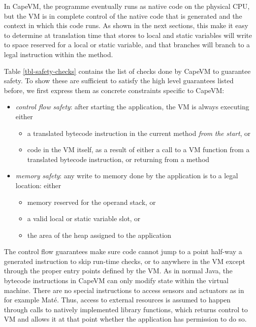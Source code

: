 In CapeVM, the programme eventually runs as native code on the physical CPU, but the VM is in complete control of the native code that is generated and the context in which this code runs. As shown in the next sections, this make it easy to determine at translation time that stores to local and static variables will write to space reserved for a local or static variable, and that branches will branch to a legal instruction within the method.

Table \ref{tbl-safety-checks} contains the list of checks done by CapeVM to guarantee safety. To show these are sufficient to satisfy the high level guarantees listed before, we first express them as concrete constraints specific to CapeVM:

\begin{itemize}
    \item \emph{control flow safety}: after starting the application, the VM is always executing either
        \begin{itemize}
            \item a translated bytecode instruction in the current method \emph{from the start}, or
            \item code in the VM itself, as a result of either a call to a VM function from a translated bytecode instruction, or returning from a method
        \end{itemize}
    \item \emph{memory safety}: any write to memory done by the application is to a legal location: either
        \begin{itemize}
            \item memory reserved for the operand stack, or
            \item a valid local or static variable slot, or
            \item the area of the heap assigned to the application
        \end{itemize}
\end{itemize}

The control flow guarantees make sure code cannot jump to a point half-way a generated instruction to skip run-time checks, or to anywhere in the VM except through the proper entry points defined by the VM. As in normal Java, the bytecode instructions in CapeVM can only modify state within the virtual machine. There are no special instructions to access sensors and actuators as in for example Maté. Thus, access to external resources is assumed to happen through calls to natively implemented library functions, which returns control to VM and allows it at that point whether the application has permission to do so.

